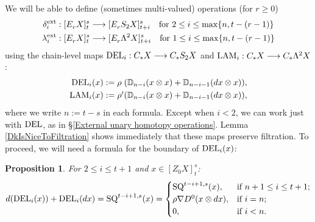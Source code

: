 \documentclass[11pt]{amsart} \renewcommand{\baselinestretch}{1.2}
\theoremstyle{plain}
\newtheorem{prop}[thm]{Proposition}
\numberwithin{equation}{section} %
\theoremstyle{plain}
\newtheorem{prop}[thm]{Proposition}
\numberwithin{equation}{chapter} %
\renewcommand{\to}{\longrightarrow}
\newcommand{\Nabla}{\nabla}
\newcommand{\Edownup}[5]{[E_{#1}^{#2}#3]^{#4}_{#5}}
\newcommand{\EZdownup}[5]{[Z^{#2}_{#1}#3]^{#4}_{#5}}
\renewcommand{\mapsto}{\longmapsto}
\begin{document}
\begin{second quadrant homotopy sseq operations}
We will be able to define (sometimes multi-valued) operations (for $r\geq 0$)
\begin{gather*}
\delta^\textup{ext}_i:\Edownup{r}{}{X}{s}{t}\to \Edownup{r}{}{S_2X}{s}{t+i}\textup{\ \ \ for $2\leq i\leq\max\{n,t-(r-1)\}$}\\
\lambda^\textup{ext}_i:\Edownup{r}{}{X}{s}{t}\to \Edownup{r}{}{\Lambda^2X}{s}{t+i}\textup{\ \ \ for $1\leq i\leq\max\{n,t-(r-1)\}$}
\end{gather*}
using the chain-level maps $\textup{DEL}_{i}:C_*X\to C_*S_2X$ and $\textup{LAM}_{i}:C_*X\to C_*\Lambda^2X$:
\begin{alignat*}{2}
\textup{DEL}_{i}(x)&:=\makebox[\widthof{$\rho'$}][l]{$\rho$}(\mathbb{D}_{n-i}(x\otimes x)+\mathbb{D}_{n-i-1}(dx\otimes x)),\\
\textup{LAM}_{i}(x)&:=\makebox[\widthof{$\rho'$}][l]{$\rho'$}(\mathbb{D}_{n-i}(x\otimes x)+\mathbb{D}_{n-i-1}(dx\otimes x)),
\end{alignat*}
where we write $n:=t-s$ in each formula. Except when $i<2$, we  can work just with $\textup{DEL}$, as in \S\ref{External unary homotopy operations}. Lemma \ref{DkIsNiceToFiltration} shows immediately that these maps  preserve filtration. 
To proceed, we will need a formula for the boundary of $\textup{DEL}_i(x)$:
\begin{prop}
\label{dvsDEL}
For $2\leq i\leq t+1$ and $x\in \EZdownup{0}{}{X}{s}{t}$:
\[d(\textup{DEL}_i(x))+ \textup{DEL}_i(dx)=\textup{SQ}^{t-i+1,s}(x)=\begin{cases}
\textup{SQ}^{t-i+1,s}(x),&\textup{if }n+1\leq i \leq t+1;\\
\rho\Nabla D^0(x\otimes dx),&\textup{if }i=n;\\
0,&\textup{if }i< n.
\end{cases}\]


\end{prop}
\end{second quadrant homotopy sseq operations}
\end{document}

